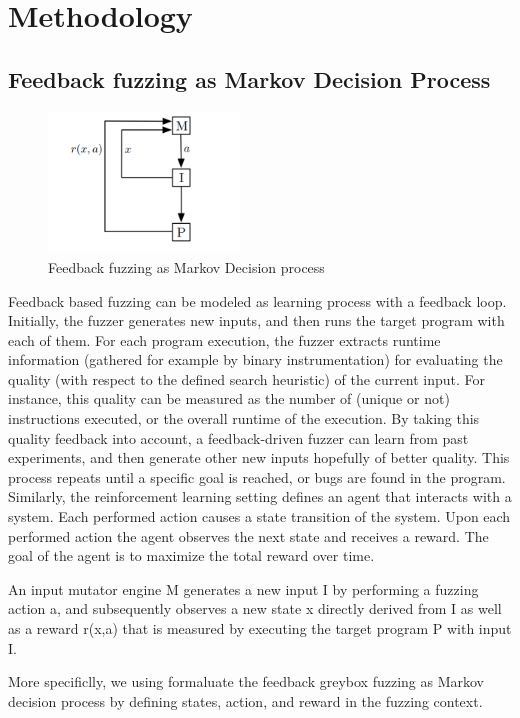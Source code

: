 \section{Methodology}\label{Methodology}

\subsection{Feedback fuzzing as Markov Decision Process}

\begin{figure}[t]
	\centering
	\includegraphics[width=2in]{pic/modeling.png}
	\caption{Feedback fuzzing as Markov Decision process}
	\label{modeling}
\end{figure}

Feedback based fuzzing can be modeled as learning process with a feedback loop. Initially, the fuzzer generates new inputs, and then runs the target program with each of them. For each program execution, the fuzzer extracts runtime information (gathered for example by binary instrumentation) for evaluating the quality (with respect to the defined search heuristic) of the current input. For instance, this quality can be measured as the number of (unique or not) instructions executed, or the overall runtime of the execution. By taking this quality feedback into account, a feedback-driven fuzzer can learn from past experiments, and then generate other new inputs hopefully of better quality. This process repeats until a specific goal is reached, or bugs are found in the program. Similarly, the reinforcement learning setting defines an agent that interacts with a system. Each performed action causes a state transition of the system. Upon each performed action the agent observes the next state and receives a reward. The goal of the agent is to maximize the total reward over time.

An input mutator engine M generates a new input I by performing a fuzzing action a, and subsequently observes a new state x directly derived from I as well as a reward r(x,a) that is measured by executing the target program P with input I.

More specificlly, we using formaluate the feedback greybox fuzzing as Markov decision process by defining states, action, and reward in the fuzzing context.

